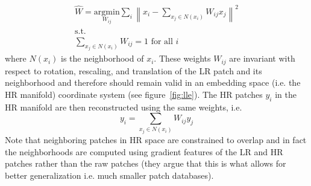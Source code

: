 \begin{gather}
	\hat{W} = \underset{W_{ij}}{\text{argmin}} \sum_i \left\| x_i - \sum_{x_j \in N(x_i)} W_{ij} x_j  \right\|^2 \nonumber \\
	\text{s.t.} \\
	\sum_{x_j \in N(x_i)} W_{ij} = 1 \text{ for all }i \nonumber
\end{gather}
where $N(x_i)$ is the neighborhood of $x_i$.
%
These weights $W_{ij}$ are invariant with respect to rotation, rescaling, and translation of the LR patch and its neighborhood\cite{saul2000introduction} and therefore should remain valid in an embedding space (i.e. the HR manifold) coordinate system (see figure~\ref{fig:lle}).
%
The HR patches $y_i$ in the HR manifold are then reconstructed using the same weights, i.e.
\begin{equation}
	y_i = \sum_{x_j \in N(x_i)} W_{ij} y_j
\end{equation}
%
Note that neighboring patches in HR space are constrained to overlap and in fact the neighborhoods are computed using gradient features of the LR and HR patches rather than the raw patches (they argue that this is what allows for better generalization i.e. much smaller patch databases).
